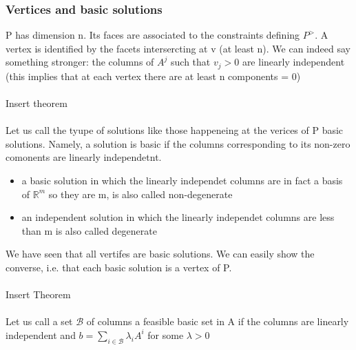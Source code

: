  \subsubsection{Vertices and basic solutions}
 P has dimension n. Its faces are associated to the constraints defining $P^>$. A vertex is identified by the facets intersercting at v (at least n). We can indeed say something stronger: the columns of $ A^j $ such that $ v_j>0 $ are linearly independent (this implies that at each vertex there are at least n components = 0)
\\\\Insert theorem\\\\
Let us call the tyupe of solutions like those happeneing at the verices of P basic solutions. Namely, a solution is basic if the columns corresponding to its non-zero comonents are linearly independetnt.
\begin{itemize}
    \item a basic solution in which the linearly independet columns are in fact a basis of $ \mathbb{R}^{m} $ so they are m, is also called non-degenerate
    \item an independent solution in which the linearly independet columns are less than m is also called degenerate  
\end{itemize}
We have seen that all vertifes are basic solutions. We can easily show the converse, i.e. that each basic solution is a vertex of P.
\\\\Insert Theorem\\\\
Let us call a set $ \mathcal{B} $ of columns a feasible basic set in A if the columns are linearly independent and $ b= \sum_{i\in\mathcal{B}}{\lambda_iA^i}$ for some $ \lambda >0 $

